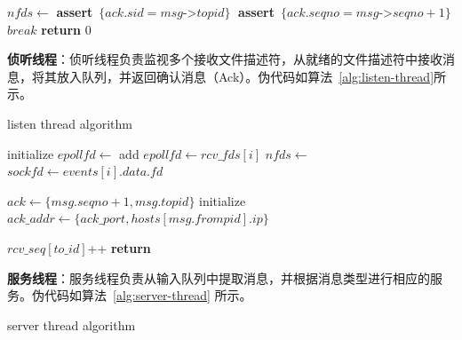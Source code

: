 {\begin{enumerate}[label=\arabic*.]
\begin{algorithm}[H]
\begin{algorithmic}[1]
                    \State $nfds \gets$  
                    \State {}
                    \State \textbf{assert}~$\{ack.sid = msg$->$topid\}\;$
                    \State \textbf{assert}~$\{ack.seqno = msg$->$seqno+1\}\;$
                    \State $break$
                \EndWhile
                \State \textbf{return} $0$
            \EndFunction
        \end{algorithmic}
    \end{algorithm}

    \textbf{侦听线程}：侦听线程负责监视多个接收文件描述符，从就绪的文件描述符中接收消息，将其放入队列，并返回确认消息（Ack）。伪代码如算法~\ref{alg:listen-thread}所示。
    \begin{algorithm}[H]
        \caption{listen thread algorithm}\label{alg:listen-thread}
        \begin{algorithmic}[1] %
                \State initialize $epollfd \gets$ 
                    \State add $epollfd \gets rcv\_fds[i]$
                \EndFor
                    \State $nfds \gets$  
                        \State $sockfd \gets events[i].data.fd$
                        \State {} 
                        
                        \State
                        \State $ack \gets \{ msg.seqno+1, msg.topid \}$
                        \State initialize $ack\_addr \gets \{ ack\_port,hosts[msg.frompid].ip \}$
                        \State {}
    
                        \State
                            \State $rcv\_seq[to\_id]$++
                            \State {} 
                        \EndIf
                    \EndFor
                \EndWhile
                \State \textbf{return}
             \EndProcedure
        \end{algorithmic}
    \end{algorithm}

    \textbf{服务线程}：服务线程负责从输入队列中提取消息，并根据消息类型进行相应的服务。伪代码如算法~\ref{alg:server-thread} 所示。
    \begin{algorithm}[H]
        \caption{server thread algorithm}\label{alg:server-thread}
        \begin{algorithmic}[1] %
                \State {}
    

\end{algorithmic}
\end{algorithm}
\end{enumerate}}
